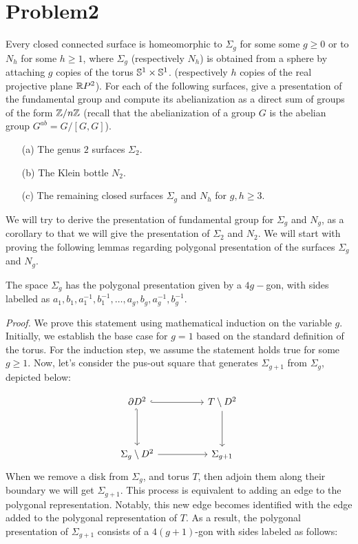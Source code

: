 \documentclass[11pt]{article}
\begin{document}
\section{Problem2}

 \begin{prob}{}{}
    Every closed connected surface is homeomorphic to $\Sigma_g$ for some some $g \geq 0$ or to $N_h$ for some $h \geq 1$, where $\Sigma_g$ (respectively $N_h$) is obtained from a sphere by attaching $g$ copies of the torus $\mathbb{S}^1 \times \mathbb{S}^1$. (respectively $h$ copies of the real projective plane $\mathbb{R} P^2$). For each of the following surfaces, give a presentation of the fundamental group and compute its abelianization as a direct sum of groups of the form $\mathbb{Z}/n\mathbb{Z}$ (recall that the abelianization of a group $G$ is the abelian group $G^{ab} = G/[G,G]$). 
\begin{enumerate}
    \item[(a)] The genus $2$ surfaces $\Sigma_2$. 
    \item[(b)] The Klein bottle $N_2$. 
    \item[(c)] The remaining closed surfaces $\Sigma_g$ and $N_h$ for $g,h \geq 3$.   
\end{enumerate}
 \end{prob}

 \sol We will try to derive the presentation of fundamental group for $\Sigma_g$ and $N_g$, as a corollary to that we will give the presentation of $\Sigma_2$ and $N_2$. We will start with proving the following lemmas regarding polygonal presentation of the surfaces $\Sigma_g$ and $N_g$. 

 \begin{Lemn}{ }{}
    The space \( \Sigma_g \) has the polygonal presentation given by a \( 4g- \)gon, with sides labelled as \( a_1,b_1,a_1^{-1}, b_1^{-1}, \dots, a_g,b_g,a_g^{-1}, b_g^{-1} \). 
 \end{Lemn}\label{lem:1}

 \noindent \textit{Proof.} We prove this statement using mathematical induction on the variable \( g \). Initially, we establish the base case for \( g = 1 \) based on the standard definition of the torus. For the induction step, we assume the statement holds true for some \( g \geq 1 \). Now, let's consider the pus-out square that generates \( \Sigma_{g+1} \) from \( \Sigma_g \), depicted below:
  
 \[\begin{tikzcd}
    {\p D^2} && T\setminus D^2 \\
    \\
    {\Sigma_g\setminus D^2} && {\Sigma_{g+1}}
    \arrow[hook, from=1-1, to=1-3]
    \arrow[hook', from=1-1, to=3-1]
    \arrow[from=3-1, to=3-3]
    \arrow[from=1-3, to=3-3]
  \end{tikzcd}\]
 When we remove a disk from \( \Sigma_g \), and torus $T$, then adjoin them along their boundary we will get $\Sigma_{g+1}$. This process is equivalent to adding an edge to the polygonal representation. Notably, this new edge becomes identified with the edge added to the polygonal representation of \( T \). As a result, the polygonal presentation of \( \Sigma_{g+1} \) consists of a \( 4(g+1) \)-gon with sides labeled as follows:
 
\end{document}
